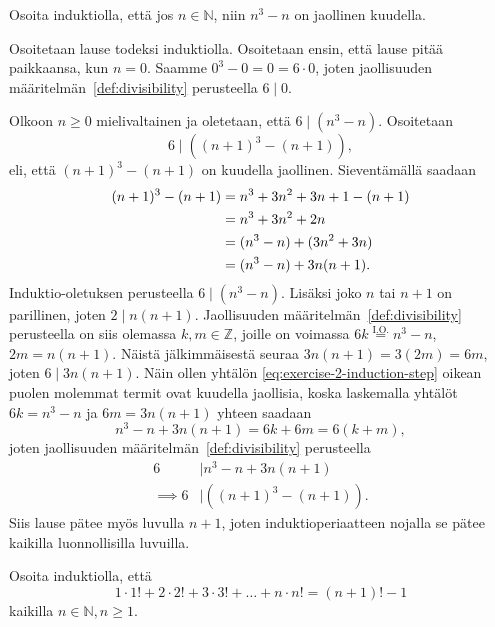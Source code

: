 \documentclass[12pt,a4paper]{article}
\begin{document}
\begin{exercise}
  Osoita induktiolla, että jos \(n \in \mathbb{N}\), niin \(n^3 - n\)
  on jaollinen kuudella.
\end{exercise}
\begin{solution}
  Osoitetaan lause todeksi induktiolla. Osoitetaan ensin, että lause pitää
  paikkaansa, kun \(n = 0\). Saamme \(0^3 - 0 = 0 = 6\cdot0\), joten
  jaollisuuden määritelmän~\ref{def:divisibility} perusteella \(6 \mid 0\).

  Olkoon \(n \geq 0\) mielivaltainen ja oletetaan, että \(6 \mid (n^3 - n)\).
  Osoitetaan
  \[
    6 \mid \left((n + 1)^3 - (n + 1)\right),
  \]
  eli, että \((n + 1)^3 - (n + 1)\) on kuudella jaollinen. Sieventämällä saadaan
  \begin{align}
    (n + 1)^3 - (n + 1) &= n^3 + 3n^2 + 3n + 1 - (n + 1) \notag \\
    &= n^3 + 3n^2 + 2n \notag \\
    &= (n^3 - n) + (3n^2 + 3n) \notag \\
    &= (n^3 - n) + 3n(n + 1). \label{eq:exercise-2-induction-step}
  \end{align}
  Induktio-oletuksen perusteella \(6 \mid (n^3 - n)\). Lisäksi joko \(n\) tai
  \(n + 1\) on parillinen, joten \(2 \mid n(n + 1)\). Jaollisuuden
  määritelmän~\ref{def:divisibility} perusteella on siis olemassa
  \(k,m \in \mathbb{Z}\), joille on voimassa
  \(6k \overset{\text{I.O.}}{=} n^3 - n\), \(2m = n(n + 1)\).
  Näistä jälkimmäisestä seuraa \(3n(n + 1) = 3(2m) = 6m\), joten \(6
  \mid 3n(n + 1)\).
  Näin ollen yhtälön \eqref{eq:exercise-2-induction-step} oikean puolen
  molemmat termit ovat kuudella jaollisia, koska
  laskemalla yhtälöt \(6k = n^3 - n\) ja \(6m = 3n(n + 1)\) yhteen
  saadaan
  \[
    n^3 - n + 3n(n + 1) = 6k + 6m = 6(k + m),
  \]
  joten jaollisuuden määritelmän~\ref{def:divisibility} perusteella
  \begin{align}
    6 & \mid n^3 - n + 3n(n + 1) \\
    \implies
    6 & \mid \left((n + 1)^3 - (n + 1)\right).
  \end{align}
  Siis lause pätee myös luvulla \(n + 1\), joten induktioperiaatteen
  nojalla se pätee kaikilla luonnollisilla luvuilla.
\end{solution}

\begin{exercise}
  Osoita induktiolla, että
  \[
    1 \cdot 1! + 2 \cdot 2! + 3 \cdot 3! + \dots + n \cdot n! = (n + 1)! - 1
  \]
  kaikilla \(n \in \mathbb{N}, n \geq 1\).
\end{exercise}
\end{document}
